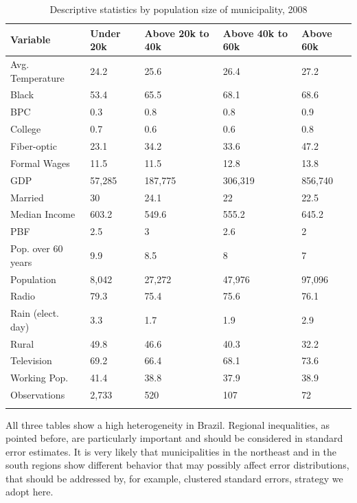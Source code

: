 \documentclass[
  12pt,
]{article}
\begin{document}
\begin{table}[H]

\caption{\label{tab:desc.2008}Descriptive statistics by population size of municipality, 2008}
\centering
\begin{tabu} to 
\toprule
Variable & Under 20k & Above 20k to 40k & Above 40k to 60k & Above 60k\\
\midrule
Avg. Temperature & 24.2 & 25.6 & 26.4 & 27.2\\
Black & 53.4 & 65.5 & 68.1 & 68.6\\
BPC & 0.3 & 0.8 & 0.8 & 0.9\\
College & 0.7 & 0.6 & 0.6 & 0.8\\
Fiber-optic & 23.1 & 34.2 & 33.6 & 47.2\\
Formal Wages & 11.5 & 11.5 & 12.8 & 13.8\\
GDP & 57,285 & 187,775 & 306,319 & 856,740\\
Married & 30 & 24.1 & 22 & 22.5\\
Median Income & 603.2 & 549.6 & 555.2 & 645.2\\
PBF & 2.5 & 3 & 2.6 & 2\\
Pop. over 60 years & 9.9 & 8.5 & 8 & 7\\
Population & 8,042 & 27,272 & 47,976 & 97,096\\
Radio & 79.3 & 75.4 & 75.6 & 76.1\\
Rain (elect. day) & 3.3 & 1.7 & 1.9 & 2.9\\
Rural & 49.8 & 46.6 & 40.3 & 32.2\\
Television & 69.2 & 66.4 & 68.1 & 73.6\\
Working Pop. & 41.4 & 38.8 & 37.9 & 38.9\\
Observations & 2,733 & 520 & 107 & 72\\
\bottomrule
{}\\
\end{tabu}
\end{table}

All three tables show a high heterogeneity in Brazil. Regional
inequalities, as pointed before, are particularly important and should
be considered in standard error estimates. It is very likely that
municipalities in the northeast and in the south regions show different
behavior that may possibly affect error distributions, that should be
addressed by, for example, clustered standard errors, strategy we adopt
here.
\end{document}
